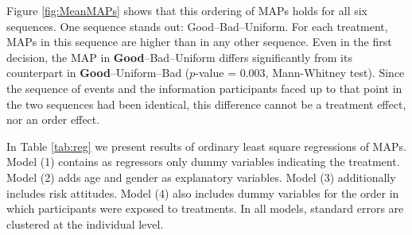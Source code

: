\documentclass[pdftex,12pt, a4paper]{article}
\begin{document}
Figure \ref{fig:MeanMAPs} shows that this ordering of MAPs holds for all six sequences.
One sequence stands out: Good--Bad--Uniform.
For each treatment, MAPs in this sequence are higher than in any other sequence.
Even in the first decision, the MAP in \textbf{Good}--Bad--Uniform differs significantly from its counterpart in \textbf{Good}--Uniform--Bad ($p$-value = 0.003, Mann-Whitney test).
Since the sequence of events and the information participants faced up to that point in the two sequences had been identical, this difference cannot be a treatment effect, nor an order effect.

In Table \ref{tab:reg} we present results of ordinary least square regressions of MAPs.
Model (1) contains as regressors only dummy variables indicating the treatment.
Model (2) adds age and gender as explanatory variables.
Model (3) additionally includes risk attitudes.
Model (4) also includes dummy variables for the order in which participants were exposed to treatments.
In all models, standard errors are clustered at the individual level.
\end{document}
